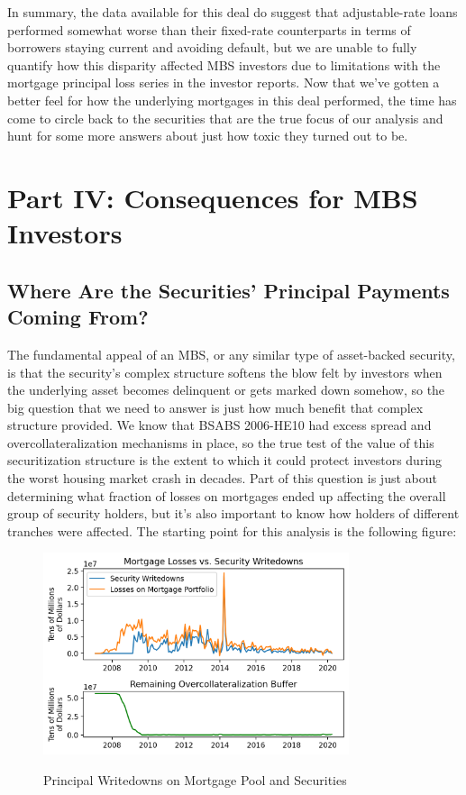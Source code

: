 \documentclass[12pt]{article}
\begin{document}
In summary, the data available for this deal do suggest that adjustable-rate loans performed somewhat worse than their fixed-rate counterparts in terms of borrowers staying current and avoiding default, but we are unable to fully quantify how this disparity affected MBS investors due to limitations with the mortgage principal loss series in the investor reports. Now that we’ve gotten a better feel for how the underlying mortgages in this deal performed, the time has come to circle back to the securities that are the true focus of our analysis and hunt for some more answers about just how toxic they turned out to be.


\section*{Part IV: Consequences for MBS Investors}

\subsection*{Where Are the Securities' Principal Payments Coming From?}

The fundamental appeal of an MBS, or any similar type of asset-backed security, is that the security’s complex structure softens the blow felt by investors when the underlying asset becomes delinquent or gets marked down somehow, so the big question that we need to answer is just how much benefit that complex structure provided. We know that BSABS 2006-HE10 had excess spread and overcollateralization mechanisms in place, so the true test of the value of this securitization structure is the extent to which it could protect investors during the worst housing market crash in decades. Part of this question is just about determining what fraction of losses on mortgages ended up affecting the overall group of security holders, but it’s also important to know how holders of different tranches were affected. The starting point for this analysis is the following figure: 

\begin{figure}[h]
	\centering
	\caption{Principal Writedowns on Mortgage Pool and Securities}
	\includegraphics[width=0.8\textwidth]{../figures/timeseries_losses_vs_writedowns}
	\label{fig:timeseries_losses_vs_writedowns}
\end{figure}
\end{document}
